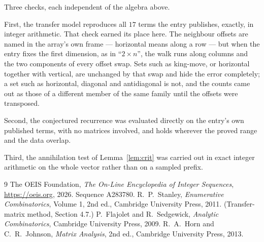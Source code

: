 \documentclass[11pt,a4paper]{article}
\theoremstyle{plain}
\theoremstyle{definition}
\begin{document}
Three checks, each independent of the algebra above.

First, the transfer model reproduces all $17$ terms the entry publishes, exactly, in
integer arithmetic. That check earned its place here. The neighbour offsets are named in the
array's own frame --- horizontal means along a row --- but when the entry fixes the first
dimension, as in ``$2\times n$'', the walk runs along columns and the two components of every
offset swap. Sets such as king-move, or horizontal together with vertical, are unchanged by
that swap and hide the error completely; a set such as horizontal, diagonal and antidiagonal
is not, and the counts came out as those of a different member of the same family until the
offsets were transposed.

Second, the conjectured recurrence was evaluated directly on the entry's own published terms,
with no matrices involved, and holds wherever the proved range and the data overlap.

Third, the annihilation test of Lemma~\ref{lem:crit} was carried out in exact integer
arithmetic on the whole vector rather than on a sampled prefix.

\begin{thebibliography}{9}
 The OEIS Foundation, \emph{The On-Line Encyclopedia of Integer
Sequences}, \url{https://oeis.org}, 2026. Sequence A283780.
 R.~P.~Stanley, \emph{Enumerative Combinatorics}, Volume 1, 2nd ed.,
Cambridge University Press, 2011. (Transfer-matrix method, Section 4.7.)
 P.~Flajolet and R.~Sedgewick, \emph{Analytic Combinatorics}, Cambridge
University Press, 2009.
 R.~A.~Horn and C.~R.~Johnson, \emph{Matrix Analysis}, 2nd ed., Cambridge
University Press, 2013.
\end{thebibliography}
\end{document}
